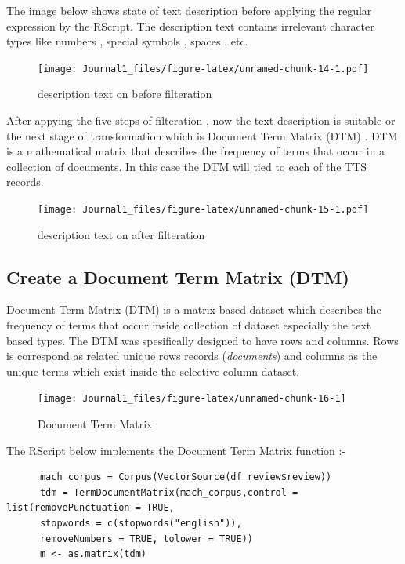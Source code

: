 \documentclass[]{article}
\begin{document}
The image below shows state of text description before applying the
regular expression by the RScript. The description text contains
irrelevant character types like numbers , special symbols , spaces ,
etc.

\begin{figure}[htbp]
\centering
\texttt{[image: Journal1\_files/figure-latex/unnamed-chunk-14-1.pdf]}
\caption{description text on before filteration}
\end{figure}

After appying the five steps of filteration , now the text description
is suitable or the next stage of transformation which is Document Term
Matrix (DTM) . DTM is a mathematical matrix that describes the frequency
of terms that occur in a collection of documents. In this case the DTM
will tied to each of the TTS records.

\begin{figure}[htbp]
\centering
\texttt{[image: Journal1\_files/figure-latex/unnamed-chunk-15-1.pdf]}
\caption{description text on after filteration}
\end{figure}

\subsection{Create a Document Term Matrix
(DTM)}\label{create-a-document-term-matrix-dtm}

Document Term Matrix (DTM) is a matrix based dataset which describes the
frequency of terms that occur inside collection of dataset especially
the text based types. The DTM was spesifically designed to have rows and
columns. Rows is correspond as related unique rows records
(\emph{documents}) and columns as the unique terms which exist inside
the selective column dataset.

\begin{figure}

{\centering \texttt{[image: Journal1\_files/figure-latex/unnamed-chunk-16-1]} 

}

\caption{Document Term Matrix}\label{fig:unnamed-chunk-16}
\end{figure}

\pagebreak

The RScript below implements the Document Term Matrix function :-

\begin{verbatim}
      mach_corpus = Corpus(VectorSource(df_review$review))
      tdm = TermDocumentMatrix(mach_corpus,control = list(removePunctuation = TRUE,
      stopwords = c(stopwords("english")),
      removeNumbers = TRUE, tolower = TRUE))
      m <- as.matrix(tdm)
\end{verbatim}
\end{document}
